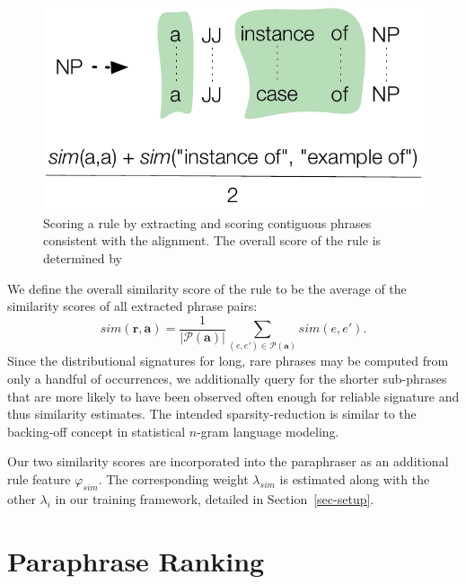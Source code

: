 \documentclass[11pt]{article}
\begin{document}
\begin{figure}[!t]
\begin{center}
\includegraphics[width=0.85\linewidth]{figures/pattern_scoring.pdf}
\end{center}
\caption{Scoring a rule by extracting and scoring contiguous phrases
  consistent with the alignment. The overall score of the rule is
  determined by}\label{fig-pattern-scoring}
\end{figure}

We define the overall similarity score of the rule to be the average
of the similarity scores of all extracted phrase pairs:
\begin{equation*}
  \mathit{sim}(\mathbf{r}, \mathbf{a}) = \frac{1}{|\mathcal{P}(\mathbf{a})|}
  \sum_{(e, e') \in \mathcal{P}(\mathbf{a})}\mathit{sim}(e, e') .
\end{equation*}
Since the distributional signatures for long, rare phrases may be
computed from only a handful of occurrences, we additionally query for
the shorter sub-phrases that are more likely to have been observed
often enough for reliable signature and thus similarity estimates. The
intended sparsity-reduction is similar to the backing-off concept in
statistical $n$-gram language modeling.

Our two similarity scores are incorporated into the paraphraser as an
additional rule feature $\varphi_{\mathit{sim}}$. The corresponding
weight $\lambda_{\mathit{sim}}$ is estimated along with the other
$\lambda_i$ in our training framework, detailed in
Section~\ref{sec-setup}.


\section{Paraphrase Ranking}
\label{sec-ranking}
\end{document}
